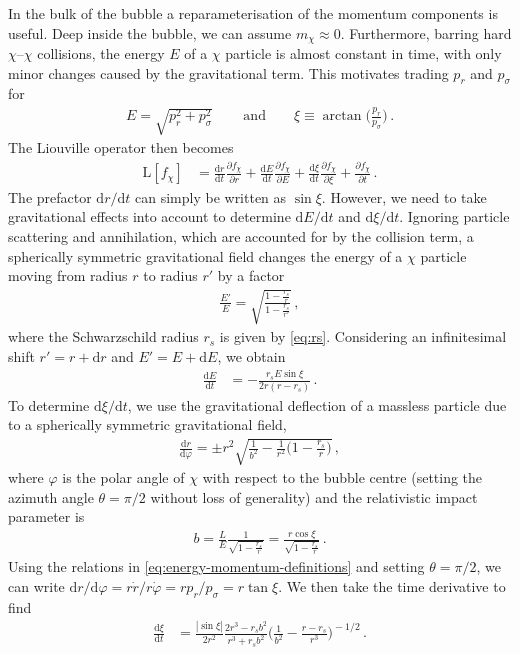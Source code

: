 \documentclass[
onecolumn, %
11pt, %
tightenlines,
superscriptaddress, %
nofootinbib, %
preprintnumbers, %
prd %
]{revtex4-1}
\newcommand{\pd}[2]{\frac{\partial #1}{\partial #2}}                  %
\newcommand{\td}[2]{\frac{\mathrm d #1}{\mathrm d #2}}                %
\newcommand{\tdtext}[2]{{\mathrm d #1}/ {\mathrm d #2}}               %
\newcommand{\upd}{\mathrm d}                                          %
\newcommand{\ba}[1]{\bigg(#1\bigg)}                                   %
\newcommand{\f}{\ensuremath{f_\chi}\xspace}
\begin{document}
In the bulk of the bubble a reparameterisation of the momentum components is useful. Deep inside the bubble, we can assume $m_\chi \approx 0$. Furthermore, barring hard $\chi$--$\chi$ collisions, the energy $E$ of a $\chi$ particle is almost constant in time, with only minor changes caused by the gravitational term.  This motivates trading $p_r$ and $p_\sigma$ for
%
\begin{align}
	E   = \sqrt{p_r^2+p_\sigma^2}\,
	\qquad\text{and}\qquad
	\xi \equiv {\arctan} \ba{ \frac{p_r}{p_\sigma} } \,.
	\label{eq:p-xi}
\end{align}
%
The Liouville operator then becomes
%
\begin{align}
	\boldsymbol{\mathrm L}[\f] 
	&= \td{r}{t} \pd{\f}{r} + \td{E}{t} \pd{\f}{E} + \td{\xi}{t} \pd{\f}{\xi}
	 + \pd{\f}{t} \,.
    \label{eq:liouville-4}
\end{align}
%
The prefactor $\tdtext{r}{t}$ can simply be written as $\sin \xi$.  However, we need to take gravitational effects into account to determine $\tdtext{E}{t}$ and $\tdtext{\xi}{t}$.  Ignoring particle scattering and annihilation, which are accounted for by the collision term, a spherically symmetric gravitational field changes the energy of a $\chi$ particle moving from radius $r$ to radius $r'$ by a factor
%
\begin{align}
    \frac{E'}{E}=\sqrt{\frac{1-\frac{r_s}{r}}{1-\frac{r_s}{r'}}}\,,
\end{align}
%
where the Schwarzschild radius $r_s$ is given by \cref{eq:rs}. Considering an infinitesimal shift $r'=r+\upd r$ and $E'=E+\upd E$, we obtain
%
\begin{align}
    \td{E}{t} &= -\frac{r_s E \sin\xi}{2r(r-r_s)} \,.
    \label{eq:dpdt-grav}
\end{align}
%
To determine $\tdtext{\xi}{t}$, we use the gravitational deflection of a massless particle due to a spherically symmetric gravitational field,
%
\begin{align}
    \td{r}{\varphi}=\pm r^2{\sqrt{\frac{1}{b^2}-\frac{1}{r^2}\bigg(1-\frac{r_s}{r}\bigg)}}\,,
\end{align}
%
where $\varphi$ is the polar angle of $\chi$ with respect to the bubble centre (setting the azimuth angle $\theta=\pi/2$ without loss of generality) and the relativistic impact parameter is
%
\begin{align}
    b=\frac{L}{E}\frac{1}{\sqrt{1-\frac{r_s}{r}}}=\frac{r\cos \xi}{\sqrt{1-\frac{r_s}{r}}}\,.
\end{align}
%
Using the relations in \cref{eq:energy-momentum-definitions} and setting $\theta=\pi/2$, we can write $\tdtext{r}{\varphi} = r \dot{r} / r \dot{\varphi} = r p_r / p_\sigma = r \tan\xi$.  We then take the time derivative to find
%
\begin{align}
    \td{\xi}{t} &= \frac{|\sin\xi|}{2r^2}\frac{2r^3-r_s b^2}{r^3+r_s b^2}\ba{\frac{1}{b^2}-\frac{r-r_s}{r^3}}^{\!-1/2} \,.
    \label{eq:dxidt-grav}
\end{align}
\end{document}
